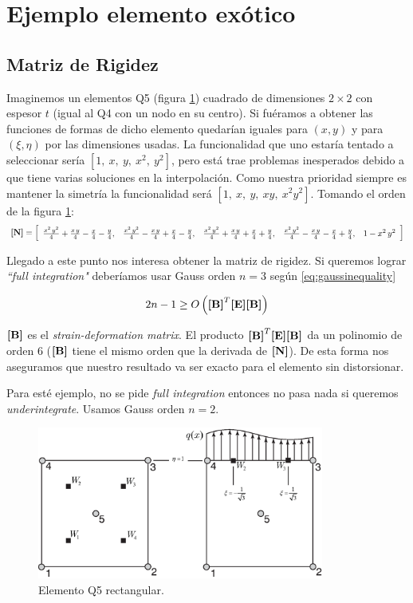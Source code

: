 \section*{Ejemplo elemento exótico}
\subsection*{Matriz de Rigidez}
Imaginemos un elementos Q5 (figura \ref{fig:elemq5}) cuadrado de dimensiones $2\times2$ con espesor $t$  (igual al Q4 con un nodo en su centro). Si fuéramos a obtener las funciones de formas de dicho elemento quedarían iguales para $(x,y)$ y para $(\xi,\eta)$ por las dimensiones usadas. La funcionalidad que uno estaría tentado a seleccionar sería $[1,\ x, \ y,\ x^2, \ y^2 ]$, pero está trae problemas inesperados debido a que tiene varias soluciones en la interpolación. Como nuestra prioridad siempre es mantener la simetría la funcionalidad será $[1,\ x,\ y,\ xy,\ x^2y^2 ]$.  Tomando el orden de la figura \ref{fig:elemq5}:
\[
\boldsymbol{[}\mathbf{N} \boldsymbol{]}=\left[\begin{array}{ccccc} \frac{x^2\,y^2}{4}+\frac{x\,y}{4}-\frac{x}{4}-\frac{y}{4}, & \frac{x^2\,y^2}{4}-\frac{x\,y}{4}+\frac{x}{4}-\frac{y}{4}, & \frac{x^2\,y^2}{4}+\frac{x\,y}{4}+\frac{x}{4}+\frac{y}{4}, & \frac{x^2\,y^2}{4}-\frac{x\,y}{4}-\frac{x}{4}+\frac{y}{4}, & 1-x^2\,y^2 \end{array}\right]
\]

Llegado a este punto nos interesa obtener la matriz de rigidez. Si queremos lograr \emph{``full integration"} deberíamos usar Gauss orden $n=3$ según \eqref{eq:gaussinequality}

\begin{equation} \label{eq:gaussinequality}
2n-1\geq O\left(\boldsymbol{[}\mathbf{B} \boldsymbol{]}^T \boldsymbol{[}\mathbf{E} \boldsymbol{]} \boldsymbol{[}\mathbf{B} \boldsymbol{]} \right)
\end{equation}


$\boldsymbol{[}\mathbf{B} \boldsymbol{]}$ es el \textit{strain-deformation matrix}. El producto $\boldsymbol{[}\mathbf{B} \boldsymbol{]}^T \boldsymbol{[}\mathbf{E} \boldsymbol{]} \boldsymbol{[}\mathbf{B} \boldsymbol{]}$ da un polinomio de orden 6 ($\boldsymbol{[}\mathbf{B} \boldsymbol{]}$ tiene el mismo orden que la derivada de $\boldsymbol{[}\mathbf{N} \boldsymbol{]}$). De esta forma nos aseguramos que nuestro resultado va ser exacto para el elemento sin distorsionar.

Para esté ejemplo, no se pide \emph{full integration} entonces no pasa nada si queremos \emph{underintegrate}. Usamos Gauss orden $n=2$. 

\begin{figure}[htb!]
	\centering
	\includegraphics[height=5cm]{fig/exoticElement.eps}
	\caption{Elemento Q5 rectangular.}
	\label{fig:elemq5}
\end{figure}

